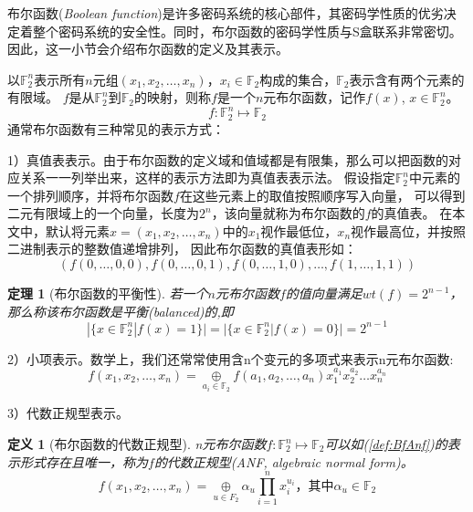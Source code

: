 \documentclass{xduugthesis}
\newtheorem{definition}{定义}
\newtheorem{mytheorem}{定理}[section]
\begin{document}
布尔函数(\emph{Boolean function})是许多密码系统的核心部件，其密码学性质的优劣决定着整个密码系统的安全性。同时，布尔函数的密码学性质与S盒联系非常密切。
因此，这一小节会介绍布尔函数的定义及其表示。\par
以$\mathbb{F}_2^n$表示所有$n$元组$(x_1, x_2, \dots ,x_n)$，$x_i\in \mathbb{F}_2$构成的集合，$\mathbb{F}_2$表示含有两个元素的有限域。
$f$是从$\mathbb{F}_2^n$到$\mathbb{F}_2$的映射，则称$f$是一个$n$元布尔函数，记作$f(x)$, $x\in \mathbb{F}_2^n$。
$$
    f: \mathbb{F}_2^n \mapsto \mathbb{F}_2
$$
通常布尔函数有三种常见的表示方式：\par
1）真值表表示。由于布尔函数的定义域和值域都是有限集，那么可以把函数的对应关系一一列举出来，这样的表示方法即为真值表表示法。
假设指定$\mathbb{F}_2^n$中元素的一个排列顺序，并将布尔函数$f$在这些元素上的取值按照顺序写入向量，
可以得到二元有限域上的一个向量，长度为$2^n$，该向量就称为布尔函数的$f$的真值表。
在本文中，默认将元素$x=(x_1, x_2, \dots , x_n)$中的$x_1$视作最低位，$x_n$视作最高位，并按照二进制表示的整数值递增排列，
因此布尔函数的真值表形如：
$$
    (f(0,\dots ,0,0), f(0,\dots ,0,1), f(0,\dots ,1,0),\dots ,f(1,\dots ,1,1))
$$\par

\begin{mytheorem}[布尔函数的平衡性]\label{thm:balance}
    若一个$n$元布尔函数$f$的值向量满足$wt(f)=2^{n-1}$，那么称该布尔函数是平衡(\emph{balanced})的,即
    \begin{equation}
        |\{x\in \mathbb{F}_2^n |f(x)=1 \}| = |\{x\in \mathbb{F}_2^n |f(x)=0 \}| = 2^{n-1} 
    \end{equation}\par
\end{mytheorem}\par

2）小项表示。数学上，我们还常常使用含n个变元的多项式来表示n元布尔函数:
\begin{equation}
    f(x_1,x_2,\dots ,x_n) = \mathop{\oplus}\limits_{a_i \in \mathbb{F}_2}f(a_1,a_2,\dots,a_n)x_1^{a_1}x_2^{a_2}\dots x_n^{a_n}
\end{equation}\par

3）代数正规型表示。
\begin{definition}[布尔函数的代数正规型]
n元布尔函数$f:\mathbb{F}_2^n \mapsto \mathbb{F}_2$可以如(\ref{def:BfAnf})的表示形式存在且唯一，称为$f$的代数正规型(ANF, algebraic normal form)。
\begin{equation}
f(x_1,x_2,\dots ,x_n) = \mathop{\oplus}\limits_{u \in F_2}\alpha_u \prod\limits_{i=1}^n x_i^{u_i}\mbox{，其中}\alpha_u \in \mathbb{F}_2 \label{def:BfAnf}
\end{equation}
\end{definition}\par
\end{document}
